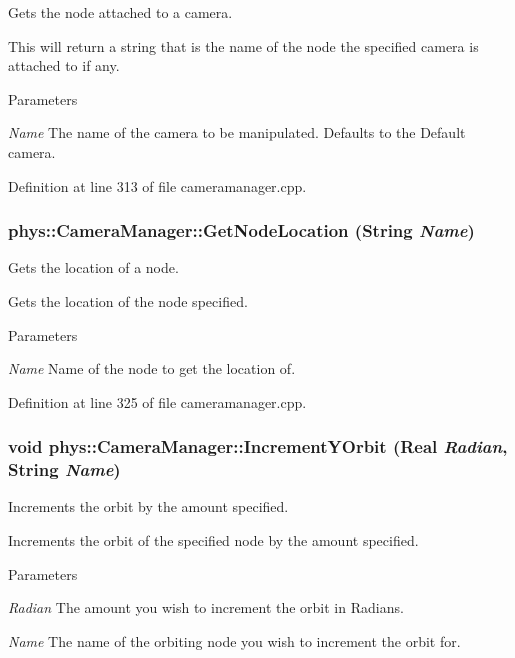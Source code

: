 Gets the node attached to a camera. 

This will return a string that is the name of the node the specified camera is attached to if any. 
\begin{DoxyParams}{Parameters}
\item[{\em Name}]The name of the camera to be manipulated. Defaults to the Default camera. \end{DoxyParams}


Definition at line 313 of file cameramanager.cpp.

\hypertarget{classphys_1_1CameraManager_af5fcec9bebd90b8e98b0d2f4def97ea1}{
\subsubsection[{GetNodeLocation}]{ phys::CameraManager::GetNodeLocation ({\bf String} {\em Name})}}
\label{d9/d91/classphys_1_1CameraManager_af5fcec9bebd90b8e98b0d2f4def97ea1}


Gets the location of a node. 

Gets the location of the node specified. 
\begin{DoxyParams}{Parameters}
\item[{\em Name}]Name of the node to get the location of. \end{DoxyParams}


Definition at line 325 of file cameramanager.cpp.

\hypertarget{classphys_1_1CameraManager_a82001f0874a090717ced3fbe78ce795b}{
\subsubsection[{IncrementYOrbit}]{\setlength{\rightskip}{0pt plus 5cm}void phys::CameraManager::IncrementYOrbit ({\bf Real} {\em Radian}, \/  {\bf String} {\em Name})}}
\label{d9/d91/classphys_1_1CameraManager_a82001f0874a090717ced3fbe78ce795b}


Increments the orbit by the amount specified. 

Increments the orbit of the specified node by the amount specified. 
\begin{DoxyParams}{Parameters}
\item[{\em Radian}]The amount you wish to increment the orbit in Radians. \item[{\em Name}]The name of the orbiting node you wish to increment the orbit for. \end{DoxyParams}


